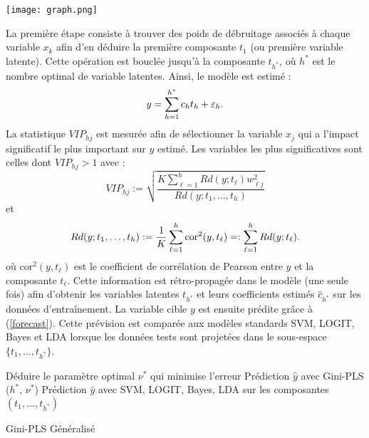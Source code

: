 \begin{center}
	\texttt{[image: graph.png]}
\end{center}


La première étape consiste à trouver des poids de débruitage associés à chaque variable $x_k$ afin d'en déduire la première composante $t_1$ (ou première variable latente). Cette opération est bouclée jusqu'à la composante $t_{h^*}$, où $h^*$ est le nombre optimal de variable latentes. Ainsi, le modèle est estimé :
\begin{equation}\label{forecast}
y=\sum_{h=1}^{h^*} c_ht_h +\varepsilon_h.
\end{equation} 
La statistique $VIP_{hj}$ est mesurée afin de sélectionner la variable $x_j$ qui a l'impact significatif le plus important sur $y$ estimé. Les variables les plus significatives sont celles dont $VIP_{hj}>1$ avec :
\[
VIP_{hj} := \sqrt{\frac{K\sum_{\ell=1}^{h}Rd(y;t_\ell)w_{\ell j}^2}{Rd(y;t_1,\ldots,t_h)}} 
\] 
et 
\[
Rd(y; t_1,\ldots,t_h) := \frac{1}{K}\sum_{\ell=1}^{h}\text{cor}^2(y,t_\ell) =: \sum_{\ell=1}^{h}Rd(y;t_\ell).
\]
où $\text{cor}^2(y,t_\ell)$ est le coefficient de corrélation de Pearson entre $y$ et la composante $t_\ell$. Cette information est rétro-propagée dans le modèle (une seule fois) afin d'obtenir les variables latentes $t_{h^*}$ et leurs coefficients estimés $\hat{c}_{h^*}$ sur les données d'entraînement. La variable cible $y$ est ensuite prédite grâce à (\ref{forecast}). Cette prévision est comparée aux modèles standards SVM, LOGIT, Bayes et LDA lorsque les données tests sont projetées dans le sous-espace $\{t_1,\ldots,t_{h^*}\}$.


\begin{algorithm}[h]
	\small
	Déduire le paramètre optimal $\nu^*$ qui minimise l'erreur \; 
	\Return Prédiction $\hat{y}$ avec Gini-PLS ($h^*$, $\nu^*$) \;
	\Return Prédiction $\hat{y}$ avec SVM, LOGIT, Bayes, LDA sur les composantes $(t_1,\ldots,t_{h^*})$\;
	\caption{Gini-PLS Généralisé}\label{G-GPLS}
\end{algorithm}
\bigskip

